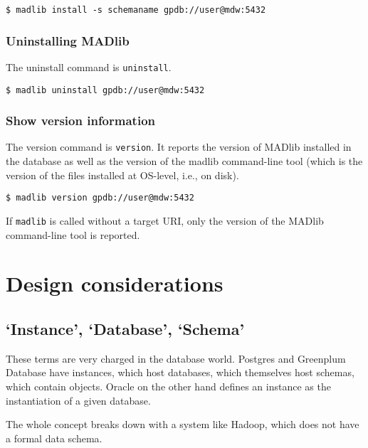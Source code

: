 \documentclass[11pt]{article}
\begin{document}
{		\begin{lstlisting}
$ madlib install -s schemaname gpdb://user@mdw:5432
		\end{lstlisting}

	\subsubsection{Uninstalling MADlib}

		The uninstall command is \texttt{uninstall}.

		\begin{lstlisting}
$ madlib uninstall gpdb://user@mdw:5432
		\end{lstlisting}

	\subsubsection{Show version information}

		The version command is \texttt{version}. It reports the version of MADlib installed in the database as well as the version of the madlib command-line tool (which is the version of the files installed at OS-level, i.e., on disk).

		\begin{lstlisting}
$ madlib version gpdb://user@mdw:5432
		\end{lstlisting}
		
		If \texttt{madlib} is called without a target URI, only the version of the MADlib command-line tool is reported.

\ifx\pdfoutput\undefined %
\else
{}
\fi

\section{Design considerations}
	
	\subsection{`Instance', `Database', `Schema'}

	These terms are very charged in the database world. Postgres and Greenplum
	Database have instances, which host databases, which themselves host
	schemas, which contain objects. Oracle on the other hand defines an instance
	as the instantiation of a given database.

	The whole concept breaks down with a system like Hadoop, which does not have
	a formal data schema.

}
\end{document}
